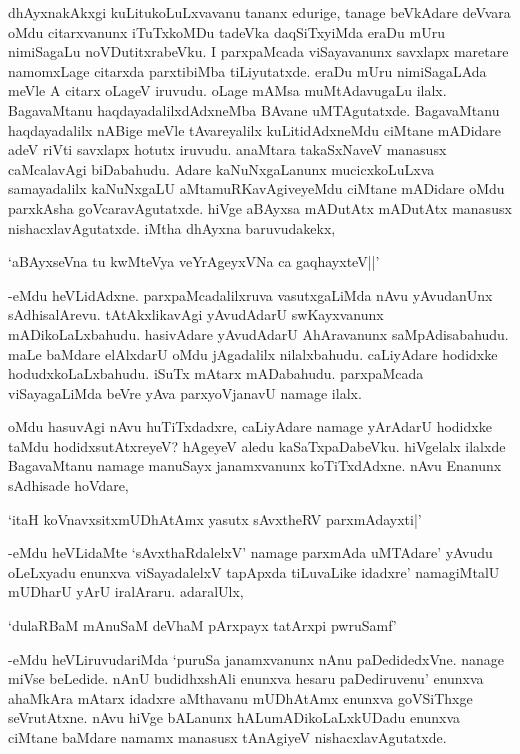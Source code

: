 dhAyxnakAkxgi kuLitukoLuLxvavanu tananx edurige, tanage beVkAdare deVvara oMdu citarxvanunx iTuTxkoMDu tadeVka daqSiTxyiMda eraDu mUru nimiSagaLu noVDutitxrabeVku. I parxpaMcada viSayavanunx savxlapx maretare namomxLage citarxda parxtibiMba tiLiyutatxde. eraDu mUru nimiSagaLAda meVle A citarx oLageV iruvudu. oLage mAMsa muMtAdavugaLu ilalx. BagavaMtanu haqdayadalilxdAdxneMba BAvane uMTAgutatxde. BagavaMtanu haqdayadalilx nABige meVle tAvareyalilx kuLitidAdxneMdu ciMtane mADidare adeV riVti savxlapx hotutx iruvudu. anaMtara takaSxNaveV manasusx caMcalavAgi biDabahudu. Adare kaNuNxgaLanunx mucicxkoLuLxva samayadalilx kaNuNxgaLU aMtamuRKavAgiveyeMdu ciMtane mADidare oMdu parxkAsha goVcaravAgutatxde. hiVge aBAyxsa mADutAtx mADutAtx manasusx nishacxlavAgutatxde. iMtha dhAyxna baruvudakekx,

\begin{shloka}
`aBAyxseVna tu kwMteVya veYrAgeyxVNa ca gaqhayxteV||'
\end{shloka} 

-eMdu heVLidAdxne. parxpaMcadalilxruva vasutxgaLiMda nAvu yAvudanUnx sAdhisalArevu. tAtAkxlikavAgi yAvudAdarU swKayxvanunx mADikoLaLxbahudu. hasivAdare yAvudAdarU AhAravanunx saMpAdisabahudu. maLe baMdare elAlxdarU oMdu jAgadalilx nilalxbahudu. caLiyAdare hodidxke hodudxkoLaLxbahudu. iSuTx mAtarx mADabahudu. parxpaMcada viSayagaLiMda beVre yAva parxyoVjanavU namage ilalx.

oMdu hasuvAgi nAvu huTiTxdadxre, caLiyAdare namage yArAdarU hodidxke taMdu hodidxsutAtxreyeV? hAgeyeV aledu kaSaTxpaDabeVku. hiVgelalx ilalxde BagavaMtanu namage manuSayx janamxvanunx koTiTxdAdxne. nAvu Enanunx sAdhisade hoVdare,

\begin{shloka}
`itaH koVnavxsitxmUDhAtAmx yasutx sAvxtheRV parxmAdayxti|'
\end{shloka} 

-eMdu heVLidaMte `sAvxthaRdalelxV' namage parxmAda uMTAdare' yAvudu oLeLxyadu enunxva viSayadalelxV tapApxda tiLuvaLike idadxre' namagiMtalU mUDharU yArU iralAraru. adaralUlx,

\begin{shloka}
`dulaRBaM mAnuSaM deVhaM pArxpayx tatArxpi pwruSamf'
\end{shloka}

-eMdu heVLiruvudariMda `puruSa janamxvanunx nAnu paDedidedxVne. nanage miVse beLedide. nAnU budidhxshAli enunxva hesaru paDediruvenu' enunxva ahaMkAra mAtarx idadxre aMthavanu mUDhAtAmx enunxva goVSiThxge seVrutAtxne. nAvu hiVge bALanunx hALumADikoLaLxkUDadu enunxva ciMtane baMdare namamx manasusx tAnAgiyeV nishacxlavAgutatxde.

